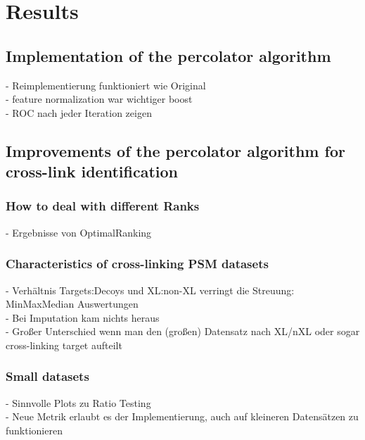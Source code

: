 \documentclass[10pt,a4paper]{article}
\begin{document}
	\section{Results}
	
		\subsection{Implementation of the percolator algorithm}
			- Reimplementierung funktioniert wie Original\\
			- feature normalization war wichtiger boost\\
			- ROC nach jeder Iteration zeigen
			
		\subsection{Improvements of the percolator algorithm for cross-link identification}
		\subsubsection{How to deal with different Ranks}
			- Ergebnisse von OptimalRanking
			
		\subsubsection{Characteristics of cross-linking PSM datasets}
			- Verhältnis Targets:Decoys und XL:non-XL verringt die Streuung: MinMaxMedian Auswertungen\\
			- Bei Imputation kam nichts heraus\\
			- Großer Unterschied wenn man den (großen) Datensatz nach XL/nXL oder sogar cross-linking target aufteilt\\
			
		\subsubsection{Small datasets}
			- Sinnvolle Plots zu Ratio Testing\\
			- Neue Metrik erlaubt es der Implementierung, auch auf kleineren Datensätzen zu funktionieren
					
\end{document}
